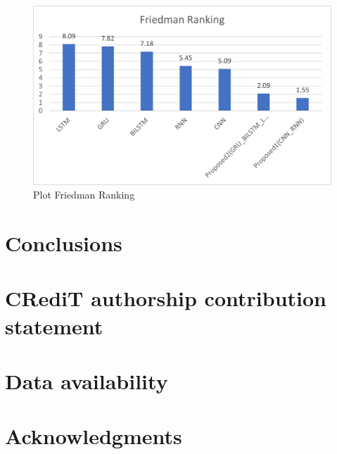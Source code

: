 \documentclass[a4paper,fleqn]{cas-sc}
\begin{document}
      \begin{figure}[!ht]
      \centering
      \includegraphics[width=\textwidth]{Friedman test}
      \caption{Plot Friedman Ranking}
      \label{Line plot12}
      \end{figure}
      



























\section{Conclusions}

\section*{CRediT authorship contribution statement}
\section*{Data availability}
\section*{Acknowledgments}
\label{}

\end{document}
